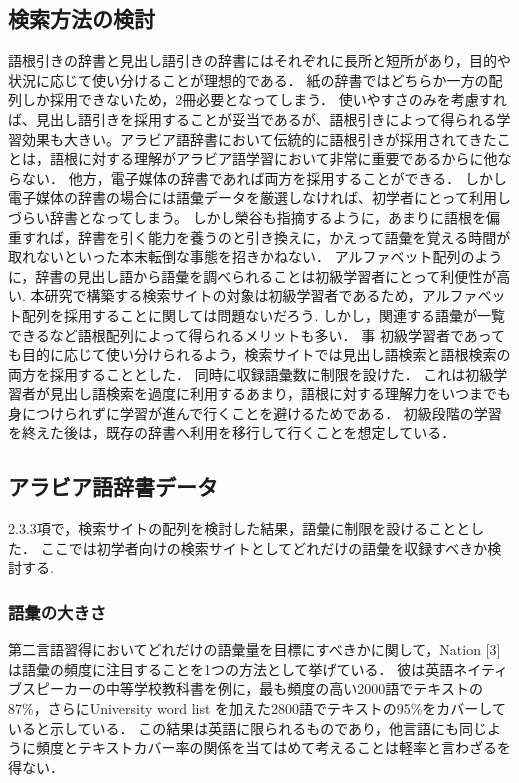 \documentclass[technicalreport]{ieicej}
\begin{document}
\subsection{検索方法の検討}
語根引きの辞書と見出し語引きの辞書にはそれぞれに長所と短所があり，目的や状況に応じて使い分けることが理想的である．
紙の辞書ではどちらか一方の配列しか採用できないため，2冊必要となってしまう．
使いやすさのみを考慮すれば、見出し語引きを採用することが妥当であるが、語根引きによって得られる学習効果も大きい。アラビア語辞書において伝統的に語根引きが採用されてきたことは，語根に対する理解がアラビア語学習において非常に重要であるからに他ならない．
他方，電子媒体の辞書であれば両方を採用することができる．
しかし電子媒体の辞書の場合には語彙データを厳選しなければ、初学者にとって利用しづらい辞書となってしまう。
しかし榮谷\cite{sakaedani2008}も指摘するように，あまりに語根を偏重すれば，辞書を引く能力を養うのと引き換えに，かえって語彙を覚える時間が取れないといった本末転倒な事態を招きかねない．
アルファベット配列のように，辞書の見出し語から語彙を調べられることは初級学習者にとって利便性が高い.
本研究で構築する検索サイトの対象は初級学習者であるため，アルファベット配列を採用することに関しては問題ないだろう.
しかし，関連する語彙が一覧できるなど語根配列によって得られるメリットも多い．
事 初級学習者であっても目的に応じて使い分けられるよう，検索サイトでは見出し語検索と語根検索の両方を採用することとした．
同時に収録語彙数に制限を設けた．
これは初級学習者が見出し語検索を過度に利用するあまり，語根に対する理解力をいつまでも身につけられずに学習が進んで行くことを避けるためである．
初級段階の学習を終えた後は，既存の辞書へ利用を移行して行くことを想定している．

\subsection{アラビア語辞書データ}
2.3.3項で，検索サイトの配列を検討した結果，語彙に制限を設けることとした．
ここでは初学者向けの検索サイトとしてどれだけの語彙を収録すべきか検討する.
\subsubsection{語彙の大きさ}
第二言語習得においてどれだけの語彙量を目標にすべきかに関して，Nation [3]は語彙の頻度に注目することを1つの方法として挙げている．
彼は英語ネイティブスピーカーの中等学校教科書を例に，最も頻度の高い2000語でテキストの87\%，さらにUniversity word list を加えた2800語でテキストの95\%をカバーしていると示している．
この結果は英語に限られるものであり，他言語にも同じように頻度とテキストカバー率の関係を当てはめて考えることは軽率と言わざるを得ない．
\end{document}
